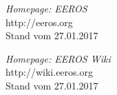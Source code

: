 \begin{thebibliography}{BA}

	 \emph{Homepage: EEROS}
	\\http://eeros.org
	\\Stand vom 27.01.2017
	
	 \emph{Homepage: EEROS Wiki}
	\\http://wiki.eeros.org
	\\Stand vom 27.01.2017
	

\end{thebibliography}

